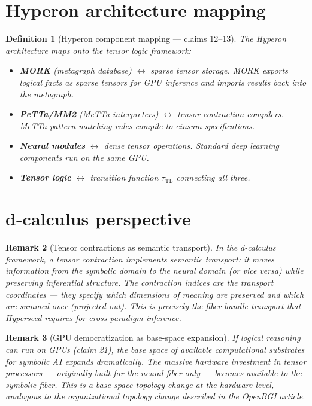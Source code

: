 \documentclass[11pt,a4paper]{article}
\newtheorem{definition}{Definition}[section]
\newtheorem{remark}[definition]{Remark}
\begin{document}
\section{Hyperon architecture mapping}
\label{sec:hyperon}

\begin{definition}[Hyperon component mapping --- claims 12--13]
\label{def:hyperon-map}
The Hyperon architecture maps onto the tensor logic framework:
\begin{itemize}
\item \textbf{MORK} (metagraph database) $\leftrightarrow$ sparse tensor
  storage. MORK exports logical facts as sparse tensors for GPU inference
  and imports results back into the metagraph.
\item \textbf{PeTTa/MM2} (MeTTa interpreters) $\leftrightarrow$ tensor
  contraction compilers. MeTTa pattern-matching rules compile to einsum
  specifications.
\item \textbf{Neural modules} $\leftrightarrow$ dense tensor operations.
  Standard deep learning components run on the same GPU.
\item \textbf{Tensor logic} $\leftrightarrow$ transition function
  $\tau_{\text{TL}}$ connecting all three.
\end{itemize}
\end{definition}

\section{d-calculus perspective}
\label{sec:d-calc}

\begin{remark}[Tensor contractions as semantic transport]
In the d-calculus framework, a tensor contraction implements semantic
transport: it moves information from the symbolic domain to the neural
domain (or vice versa) while preserving inferential structure. The
contraction indices are the transport coordinates --- they specify
which dimensions of meaning are preserved and which are summed over
(projected out). This is precisely the fiber-bundle transport that
Hyperseed requires for cross-paradigm inference.
\end{remark}

\begin{remark}[GPU democratization as base-space expansion]
If logical reasoning can run on GPUs (claim 21), the base space of
available computational substrates for symbolic AI expands dramatically.
The massive hardware investment in tensor processors --- originally
built for the neural fiber only --- becomes available to the symbolic
fiber. This is a base-space topology change at the hardware level,
analogous to the organizational topology change described in the
OpenBGI article.
\end{remark}
\end{document}
